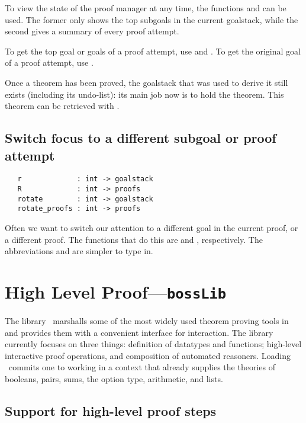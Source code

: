 {To view the state of the proof manager at any time, the functions
 and  can be used. The former only shows
the top subgoals in the current goalstack, while the second gives a
summary of every proof attempt.

To get the top goal or goals of a proof attempt, use 
and . To get the original goal of a proof attempt,
use .

Once a theorem has been proved, the goalstack that was used to derive it
still exists (including its undo-list): its main job now is to
hold the theorem. This theorem can be retrieved with
.

\subsection{Switch focus to a different subgoal or proof attempt}

\begin{hol}
\begin{verbatim}
   r             : int -> goalstack
   R             : int -> proofs
   rotate        : int -> goalstack
   rotate_proofs : int -> proofs
\end{verbatim}
\end{hol}

Often we want to switch our attention to a different goal in the current
proof, or a different proof. The functions that do this are
 and , respectively. The abbreviations
 and  are simpler to type in.

\section{High Level Proof---\texttt{bossLib}}
\label{sec:bossLib}
\newcommand\bossLib{\ml{bossLib}}

The library \bossLib\ marshalls some of the most widely used theorem
proving tools in \HOL{} and provides them with a convenient interface
for interaction. The library currently focuses on three things:
definition of datatypes and functions; high-level interactive proof
operations, and composition of automated reasoners. Loading \bossLib\
commits one to working in a context that already supplies the theories
of booleans, pairs, sums, the option type, arithmetic, and lists.


\subsection{Support for high-level proof steps}
\label{sec:high-level-proof-steps}

}
